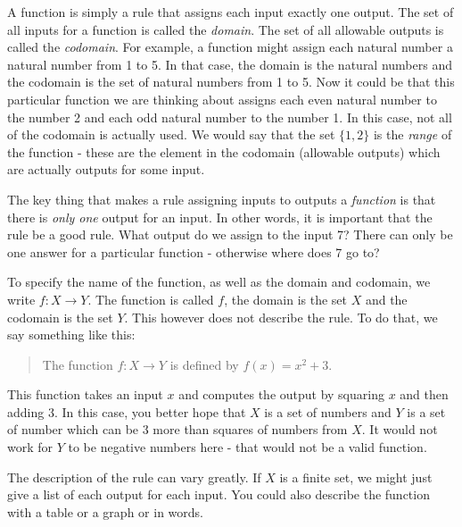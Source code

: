 \documentclass[12pt]{article}
\begin{document}
A function is simply a rule that assigns each input exactly one output.  The set of all inputs for a function is called the \emph{domain}.  The set of all allowable outputs is called the \emph{codomain}.  For example, a function might assign each natural number a natural number from 1 to 5.  In that case, the domain is the natural numbers and the codomain is the set of natural numbers from 1 to 5. Now it could be that this particular function we are thinking about assigns each even natural number to the number 2 and each odd natural number to the number 1.  In this case, not all of the codomain is actually used.  We would say that the set $\{1,2\}$ is the \emph{range} of the function - these are the element in the codomain (allowable outputs) which are actually outputs for some input. 

The key thing that makes a rule assigning inputs to outputs a \emph{function} is that there is \emph{only one} output for an input.  In other words, it is important that the rule be a good rule.  What output do we assign to the input 7?  There can only be one answer for a particular function - otherwise where does 7 go to?  

To specify the name of the function, as well as the domain and codomain, we write $f:X \to Y$.  The function is called $f$, the domain is the set $X$ and the codomain is the set $Y$.  This however does not describe the rule.  To do that, we say something like this:

\begin{quote}
  The function $f:X \to Y$ is defined by $f(x) = x^2 + 3$.
\end{quote}

This function takes an input $x$ and computes the output by squaring $x$ and then adding 3.  In this case, you better hope that $X$ is a set of numbers and $Y$ is a set of number which can be 3 more than squares of numbers from $X$.  It would not work for $Y$ to be negative numbers here - that would not be a valid function.

The description of the rule can vary greatly.  If $X$ is a finite set, we might just give a list of each output for each input.  You could also describe the function with a table or a graph or in words.
\end{document}
